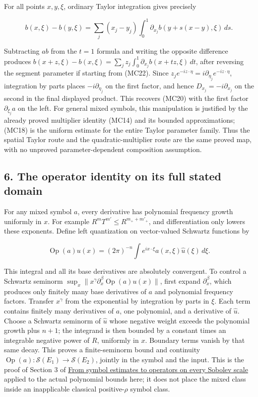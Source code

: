 \documentclass[
  11pt,
]{article}
\begin{document}
For all points \(x,y,\xi\), ordinary Taylor integration gives precisely

\[
b(x,\xi)-b(y,\xi)
=\sum_j(x_j-y_j)\int_0^1
\partial_{x_j}b(y+s(x-y),\xi)\,ds.
\tag{MC22}
\]

Subtracting \(ab\) from the \(t=1\) formula and writing the opposite
difference produces
\(b(x+z,\xi)-b(x,\xi)=\sum_jz_j\int_0^1\partial_{x_j}b(x+t z,\xi)\,dt\),
after reversing the segment parameter if starting from (MC22). Since
\(z_je^{-iz\cdot\eta}=i\partial_{\eta_j}e^{-iz\cdot\eta}\), integration
by parts places \(-i\partial_{\eta_j}\) on the first factor, and hence
\(D_{x_j}=-i\partial_{x_j}\) on the second in the final displayed
product. This recovers (MC20) with the first factor
\(\partial_{\xi_j}a\) on the left. For general mixed symbols, this
manipulation is justified by the already proved multiplier identity
(MC14) and its bounded approximations; (MC18) is the uniform estimate
for the entire Taylor parameter family. Thus the spatial Taylor route
and the quadratic-multiplier route are the same proved map, with no
unproved parameter-dependent composition assumption.

\subsection{6. The operator identity on its full stated
domain}\label{the-operator-identity-on-its-full-stated-domain}

For any mixed symbol \(a\), every derivative has polynomial frequency
growth uniformly in \(x\). For example \(R^mT^{m'}\leq R^{m_++m'_+}\),
and differentiation only lowers these exponents. Define left
quantization on vector-valued Schwartz functions by

\[
\operatorname{Op}(a)u(x)=(2\pi)^{-n}\int
e^{ix\cdot\xi}a(x,\xi)\widehat u(\xi)\,d\xi.
\tag{MC23}
\]

This integral and all its base derivatives are absolutely convergent. To
control a Schwartz seminorm
\(\sup_x\|x^\gamma\partial_x^\beta\operatorname{Op}(a)u(x)\|\), first
expand \(\partial_x^\beta\), which produces only finitely many base
derivatives of \(a\) and polynomial frequency factors. Transfer
\(x^\gamma\) from the exponential by integration by parts in \(\xi\).
Each term contains finitely many derivatives of \(a\), one polynomial,
and a derivative of \(\widehat u\). Choose a Schwartz seminorm of
\(\widehat u\) whose negative weight exceeds the polynomial growth plus
\(n+1\); the integrand is then bounded by a constant times an integrable
negative power of \(R\), uniformly in \(x\). Boundary terms vanish by
that same decay. This proves a finite-seminorm bound and continuity
\(\operatorname{Op}(a):\mathcal S(E_1)\to\mathcal S(E_2)\), jointly in
the symbol and the input. This is the proof of Section 3 of
\href{euclidean-symbol-calculus.pdf}{From symbol estimates to operators
on every Sobolev scale} applied to the actual polynomial bounds here; it
does not place the mixed class inside an inapplicable classical
positive-\(\rho\) symbol class.
\end{document}
